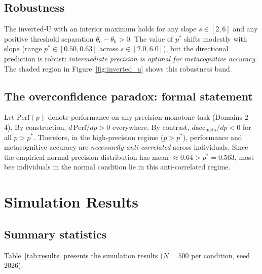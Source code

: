 \documentclass[12pt]{article}
\newcommand{\precision}{p}
\newcommand{\metaacc}{\text{acc}_{\text{meta}}}
\newcommand{\pstar}{p^*}
\newcommand{\thresh}[1]{\theta_{#1}}
\newcommand{\slope}{s}
\begin{document}
\subsection*{Robustness}

The inverted-U with an interior maximum holds for any slope $\slope \in [2, 6]$ and any positive
threshold separation $\thresh{\text{e}} - \thresh{\text{h}} > 0$. The value of $\pstar$ shifts
modestly with slope (range $\pstar \in [0.50, 0.63]$ across $\slope \in [2.0, 6.0]$), but the
directional prediction is robust: \emph{intermediate precision is optimal for metacognitive
accuracy}. The shaded region in Figure~\ref{fig:inverted_u} shows this robustness band.

\subsection*{The overconfidence paradox: formal statement}

Let $\text{Perf}(\precision)$ denote performance on any precision-monotone task (Domains 2--4).
By construction, $d\,\text{Perf}/d\precision > 0$ everywhere. By contrast, $d\metaacc/d\precision < 0$
for all $\precision > \pstar$. Therefore, in the high-precision regime ($\precision > \pstar$),
performance and metacognitive accuracy are \emph{necessarily anti-correlated} across individuals.
Since the empirical normal precision distribution has mean $\approx 0.64 > \pstar = 0.563$, most
bee individuals in the normal condition lie in this anti-correlated regime.

\section{Simulation Results}
\label{sec:simulations}

\subsection*{Summary statistics}

Table~\ref{tab:results} presents the simulation results ($N=500$ per condition, seed 2026).
\end{document}
